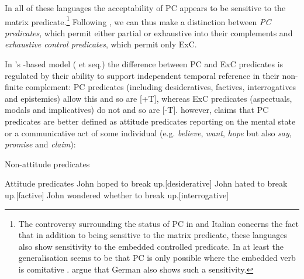 \documentclass[output=paper]{langsci/langscibook}
\begin{document}
In all of these languages the acceptability of \gls{PC} appears to be sensitive to the matrix  predicate.\footnote{The
controversy surrounding the status of \gls{PC} in
 and Italian concerns the fact that in addition to being sensitive to the
matrix  predicate, these languages also show sensitivity to the embedded
controlled predicate. In  at least the generalisation seems to be that
\gls{PC} is only possible where the embedded verb
is comitative \citep{Sheehan2014c,AuthierReed2018,PitteroffSheehan2018}.
\textcite{PitteroffEtAl2017a,PitteroffEtAl2017b} argue that German also shows
such a sensitivity.}  Following \textcite{Landau2000,Landau2004}, we
can thus make a distinction between \emph{PC predicates}, which permit either
partial or exhaustive  into their complements and \emph{exhaustive
control predicates}, which permit only \gls{ExC}.

In \citeauthor{Landau2000}’s -based model
(\citeyear{Landau2000,Landau2004} et seq.) the difference between
\gls{PC} and \gls{ExC} predicates is regulated by their ability to support independent
temporal reference in their non-finite complement: \gls{PC} predicates (including desideratives, factives, interrogatives and
    epistemics) allow this and so are [+T], whereas
    \gls{ExC} predicates (aspectuals, modals and
    implicatives) do not and so are [-T]. \citet{Pearson2016} however, claims
    that \gls{PC} predicates are better defined as
    attitude predicates reporting on the mental state or a communicative act of
    some individual (e.g. \emph{believe}, \emph{want}, \emph{hope} but also
    \emph{say}, \emph{promise} and \emph{claim}):

\ea\label{ex:key:24.8} Non-attitude predicates
	\z
\z

\ea\label{ex:key:24.9} Attitude predicates
	\ea John hoped to break up.\hfill [desiderative]
	\ex John hated to break up.\hfill [factive]
	\ex John wondered whether to break up.\hfill [interrogative]
	\z
\z
\end{document}
